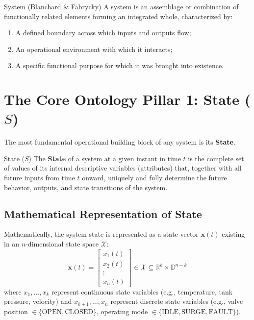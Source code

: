 \begin{definitionbox}{System (Blanchard \& Fabrycky)}
A system is an assemblage or combination of functionally related elements forming an integrated whole, characterized by:
\begin{enumerate}[label=(\alph*), itemsep=1pt]
    \item A defined boundary across which inputs and outputs flow;
    \item An operational environment with which it interacts;
    \item A specific functional purpose for which it was brought into existence.
\end{enumerate}
\end{definitionbox}

\section{The Core Ontology Pillar 1: State (\texorpdfstring{$S$}{S})}
\label{sec:ontology_state}

The most fundamental operational building block of any system is its \textbf{State}.

\begin{definitionbox}{State ($S$)}
The \textbf{State} of a system at a given instant in time $t$ is the complete set of values of its internal descriptive variables (attributes) that, together with all future inputs from time $t$ onward, uniquely and fully determine the future behavior, outputs, and state transitions of the system.
\end{definitionbox}

\subsection{Mathematical Representation of State}
Mathematically, the system state is represented as a state vector $\mathbf{x}(t)$ existing in an $n$-dimensional state space $\mathcal{X}$:
\begin{equation}
    \mathbf{x}(t) = \begin{bmatrix} x_1(t) \\ x_2(t) \\ \vdots \\ x_n(t) \end{bmatrix} \in \mathcal{X} \subseteq \mathbb{R}^k \times \mathbb{D}^{n-k}
\end{equation}
where $x_1, \dots, x_k$ represent continuous state variables (e.g., temperature, tank pressure, velocity) and $x_{k+1}, \dots, x_n$ represent discrete state variables (e.g., valve position $\in \{\text{OPEN}, \text{CLOSED}\}$, operating mode $\in \{\text{IDLE}, \text{SURGE}, \text{FAULT}\}$).

